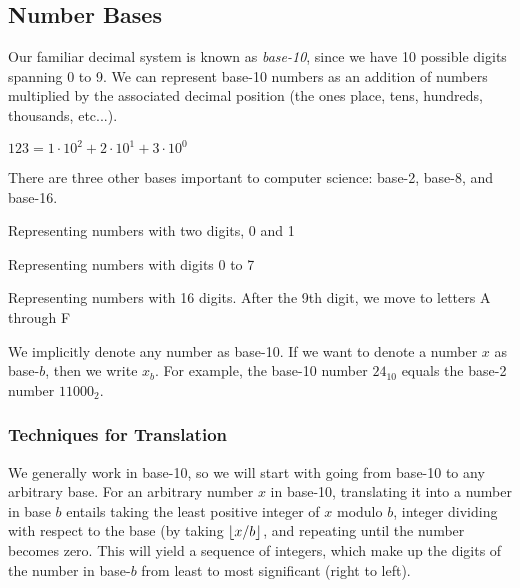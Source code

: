 \documentclass[main.tex]{subfiles}
\begin{document}
\subsection{Number Bases}
\label{diff-num-bases}

Our familiar decimal system is known as \textit{base-10}, since we have 10 possible digits spanning 0 to 9. We can represent base-10 numbers as an addition of numbers multiplied by the associated decimal position (the ones place, tens, hundreds, thousands, etc...).

\begin{example}
	\(123 = 1 \cdot 10^2 + 2 \cdot 10^1 + 3 \cdot 10^0\)
\end{example}

There are three other bases important to computer science: base-2, base-8, and base-16.

\begin{defn}
	Representing numbers with two digits, 0 and 1
\end{defn}

\begin{defn}
	Representing numbers with digits 0 to 7
\end{defn}

\begin{defn}
	Representing numbers with 16 digits. After the 9th digit, we move to letters A through F
\end{defn}

We implicitly denote any number as base-10. If we want to denote a number \(x\) as base-\(b\), then we write \(x_b\). For example, the base-10 number \(24_{10}\) equals the base-2 number \(11000_2\).

\subsubsection{Techniques for Translation}

We generally work in base-10, so we will start with going from base-10 to any arbitrary base. For an arbitrary number \(x\) in base-10, translating it into a number in base \(b\) entails taking the least positive integer of \(x\) modulo \(b\), integer dividing with respect to the base (by taking \(\lfloor x/b\rfloor\), and repeating until the number becomes zero. This will yield a sequence of integers, which make up the digits of the number in base-\(b\) from least to most significant (right to left).
\end{document}
